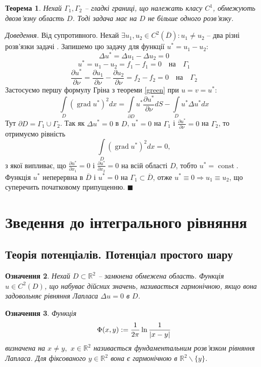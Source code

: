 \documentclass[14pt,a4paper]{extarticle}
\newcounter{e}
\newtheorem{theorem}{Теорема}[section]
\newtheorem{defn}[theorem]{Означення}
\newcommand{\proof}{\textit{Доведення. \space}}
\numberwithin{equation}{section}
\numberwithin{figure}{section}
\newcommand{\intl}{\int\limits}
\begin{document}
 \begin{theorem}
	\label{single-sol}
	Нехай $\Gamma_{1}, \Gamma_{2}$ -- гладкі границі, що належать класу $C^1$, обмежують двозв'язну область $D$. Тоді задача \boundprob \space має на $D$ не більше одного розв'язку.
 \end{theorem}
 \proof Від супротивного. Нехай $\exists u_1, u_2 \in C^{2}(\overline{D}): u_1 \neq u_2 $ -- два різні розв'язки задачі \boundprob. Запишемо цю задачу для функції $u^* = u_1 - u_2$:
 $$
 \Delta u^* = \Delta u_1 - \Delta u_2 = 0
 $$
 $$
 u^* = u_1 - u_2 = f_1 - f_1 = 0 \quad \text{на} \quad \Gamma_1
 $$
 $$
 \frac{\partial u^*}{\partial \nu}
 = \frac{\partial u_1}{\partial \nu} - \frac{\partial u_2}{\partial \nu}
 = f_2 - f_2 = 0 \quad \text{на} \quad \Gamma_2
 $$
 Застосуємо першу формулу Гріна з теореми \ref{green} при $u = v = u^*$:
 $$
 \intl_{D}(\operatorname{grad} u^*)^2 dx
 = \intl_{\partial D} u^* \frac{\partial u^*}{\partial \nu} dS
 - \intl_{D} u^* \Delta u^* dx
 $$
 Тут $\partial D = \Gamma_1 \cup \Gamma_2$. Так як $\Delta u^* = 0 $ в $D$, $u^*=0$ на $\Gamma_1$ і $\frac{\partial u^*}{\partial \nu} = 0$ на $\Gamma_2$, то отримуємо рівність
 $$
 \intl_{D}(\operatorname{grad} u^*)^2 dx = 0,
 $$
 з якої випливає, що $\frac{\partial u^*}{\partial x_1} = 0$ і $\frac{\partial u^*}{\partial x_2} = 0$ на всій області $D$, тобто $u^* = \operatorname{const}$. Функція $u^*$ неперервна в $\overline{D}$ і $u^*=0$ на $\Gamma_1 \subset \overline{D}$, отже $u^*\equiv0 \Rightarrow u_1\equiv u_2$, що суперечить початковому припущенню. $\blacksquare$
 
 \newpage
 \thispagestyle{empty}
 \section{Зведення до інтегрального рівняння}
 \subsection{Теорія потенціалів. Потенціал простого шару}

\begin{defn}
	\label{harminic-func}
	Нехай $D \subset \mathbb{R}^2$ -- замкнена обмежена область. Функція $u \in C^2(D)$, що набуває дійсних значень, називається гармонічною, якщо вона задовольняє рівняння Лапласа $\Delta u = 0$ в $D$.
\end{defn}

 \begin{defn}
	 \label{fundamental-solution}  
	 Функція
 	 \begin{equation}
		 \Phi(x, y) := \frac{1}{2\pi} \ln \frac{1}{\abs{x - y}} 
	 \end{equation}
	 визначена на  $x \neq y,$ $x \in \mathbb{R}^2$ називається фундаментальним розв'язком рівняння Лапласа. Для фіксованого $y \in \mathbb{R}^2$ вона є гармонічною в $\mathbb{R}^2 \backslash \{y\}$.
 \end{defn}
  
\end{document}
